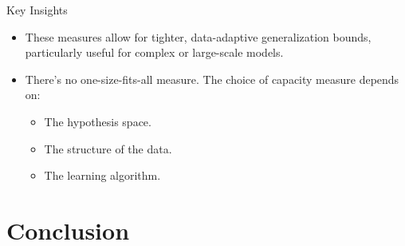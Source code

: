 \documentclass[
  ignorenonframetext,
]{beamer}
\providecommand{\tightlist}{%
  \setlength{\itemsep}{0pt}\setlength{\parskip}{0pt}}\usepackage{longtable,booktabs,array}
\begin{document}
\begin{frame}
\begin{block}{Key Insights}
\label{key-insights-4}
\begin{itemize}
\tightlist
\item
  These measures allow for tighter, data-adaptive generalization bounds,
  particularly useful for complex or large-scale models.
\item
  There's no one-size-fits-all measure. The choice of capacity measure
  depends on:

  \begin{itemize}
  \tightlist
  \item
    The hypothesis space.
  \item
    The structure of the data.
  \item
    The learning algorithm.
  \end{itemize}
\end{itemize}
\end{block}
\end{frame}

\section{Conclusion}\label{conclusion}
\end{document}
